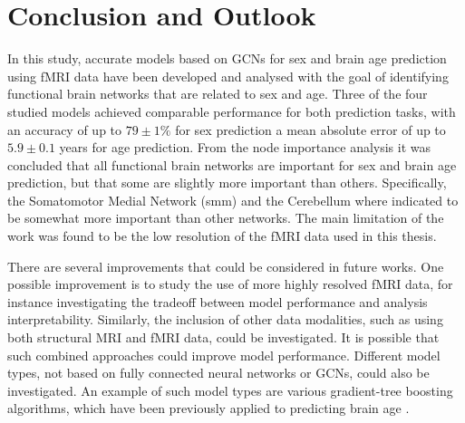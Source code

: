 

\chapter{Conclusion and Outlook}

In this study, accurate models based on GCNs for sex and brain age prediction using fMRI data have been developed and analysed with the goal of identifying functional brain networks that are related to sex and age. Three of the four studied models achieved comparable performance for both prediction tasks, with an accuracy of up to $79\pm1\%$ for sex prediction a mean absolute error of up to $5.9\pm0.1$ years for age prediction. From the node importance analysis it was concluded that all functional brain networks are important for sex and brain age prediction, but that some are slightly more important than others. Specifically, the Somatomotor Medial Network (\acrshort{smm}) and the Cerebellum where indicated to be somewhat more important than other networks. The main limitation of the work was found to be the low resolution of the fMRI data used in this thesis.

There are several improvements that could be considered in future works. One possible improvement is to study the use of more highly resolved fMRI data, for instance investigating the tradeoff between model performance and analysis interpretability. Similarly, the inclusion of other data modalities, such as using both structural MRI and fMRI data, could be investigated. It is possible that such combined approaches could improve model performance. Different model types, not based on fully connected neural networks or GCNs, could also be investigated. An example of such model types are various gradient-tree boosting algorithms, which have been previously applied to predicting brain age \cite{kaufmann}.

